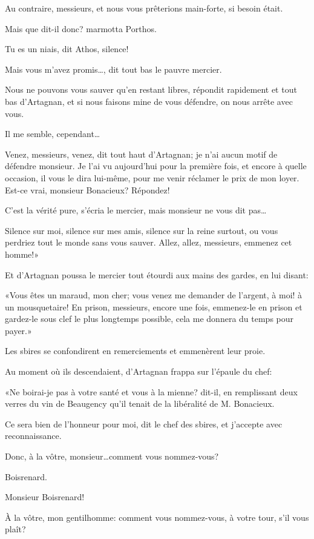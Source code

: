 \speak  Au contraire, messieurs, et nous vous prêterions main-forte, si besoin était. 

\speak  Mais que dit-il donc? marmotta Porthos. 

\speak  Tu es un niais, dit Athos, silence! 

\speak  Mais vous m'avez promis\dots, dit tout bas le pauvre mercier. 

\speak  Nous ne pouvons vous sauver qu'en restant libres, répondit rapidement et tout bas d'Artagnan, et si nous faisons mine de vous défendre, on nous arrête avec vous. 

\speak  Il me semble, cependant\dots 

\speak  Venez, messieurs, venez, dit tout haut d'Artagnan; je n'ai aucun motif de défendre monsieur. Je l'ai vu aujourd'hui pour la première fois, et encore à quelle occasion, il vous le dira lui-même, pour me venir réclamer le prix de mon loyer. Est-ce vrai, monsieur Bonacieux? Répondez! 

\speak  C'est la vérité pure, s'écria le mercier, mais monsieur ne vous dit pas\dots 

\speak  Silence sur moi, silence sur mes amis, silence sur la reine surtout, ou vous perdriez tout le monde sans vous sauver. Allez, allez, messieurs, emmenez cet homme!» 

Et d'Artagnan poussa le mercier tout étourdi aux mains des gardes, en lui disant: 

«Vous êtes un maraud, mon cher; vous venez me demander de l'argent, à moi! à un mousquetaire! En prison, messieurs, encore une fois, emmenez-le en prison et gardez-le sous clef le plus longtemps possible, cela me donnera du temps pour payer.» 

Les sbires se confondirent en remerciements et emmenèrent leur proie. 

Au moment où ils descendaient, d'Artagnan frappa sur l'épaule du chef: 

«Ne boirai-je pas à votre santé et vous à la mienne? dit-il, en remplissant deux verres du vin de Beaugency qu'il tenait de la libéralité de M. Bonacieux. 

\speak  Ce sera bien de l'honneur pour moi, dit le chef des sbires, et j'accepte avec reconnaissance. 

\speak  Donc, à la vôtre, monsieur\dots comment vous nommez-vous? 

\speak  Boisrenard. 

\speak  Monsieur Boisrenard! 

\speak  À la vôtre, mon gentilhomme: comment vous nommez-vous, à votre tour, s'il vous plaît? 

